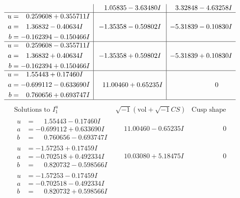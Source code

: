 \documentclass[1p]{elsarticle_modified}
\theoremstyle{definition}
\newcommand{\I}{\sqrt{-1}}
\begin{document}
$$\begin{array}{c|c|c}
 & \phantom{-}1.05835 - 3.63480 I & \phantom{-}3.32848 - 4.63258 I \\ \hline\begin{aligned}
u &= \phantom{-}0.259608 + 0.355711 I \\
a &= \phantom{-}1.36832 - 0.40634 I \\
b &= -0.162394 - 0.150466 I\end{aligned}
 & -1.35358 - 0.59802 I & -5.31839 - 0.10830 I \\ \hline\begin{aligned}
u &= \phantom{-}0.259608 - 0.355711 I \\
a &= \phantom{-}1.36832 + 0.40634 I \\
b &= -0.162394 + 0.150466 I\end{aligned}
 & -1.35358 + 0.59802 I & -5.31839 + 0.10830 I \\ \hline\begin{aligned}
u &= \phantom{-}1.55443 + 0.17460 I \\
a &= -0.699112 - 0.633690 I \\
b &= \phantom{-}0.760656 + 0.693747 I\end{aligned}
 & \phantom{-}11.00460 + 0.65235 I & \phantom{-0.000000 } 0\\
 \hline 
 \end{array}$$\newpage$$\begin{array}{c|c|c}  
\text{Solutions to }I^u_{1}& \I (\text{vol} + \sqrt{-1}CS) & \text{Cusp shape}\\
 \hline 
\begin{aligned}
u &= \phantom{-}1.55443 - 0.17460 I \\
a &= -0.699112 + 0.633690 I \\
b &= \phantom{-}0.760656 - 0.693747 I\end{aligned}
 & \phantom{-}11.00460 - 0.65235 I & \phantom{-0.000000 } 0 \\ \hline\begin{aligned}
u &= -1.57253 + 0.17459 I \\
a &= -0.702518 + 0.492334 I \\
b &= \phantom{-}0.820732 - 0.598566 I\end{aligned}
 & \phantom{-}10.03080 + 5.18475 I & \phantom{-0.000000 } 0 \\ \hline\begin{aligned}
u &= -1.57253 - 0.17459 I \\
a &= -0.702518 - 0.492334 I \\
b &= \phantom{-}0.820732 + 0.598566 I\end{aligned}

\end{array}$$
\end{document}
